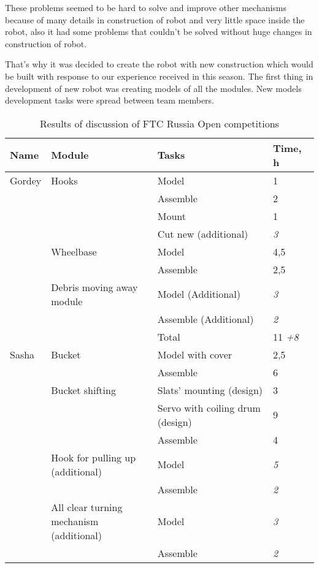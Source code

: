 These problems seemed to be hard to solve and improve other mechanisms because of many details in construction of robot and very little space inside the robot, also it had some problems that couldn't be solved without huge changes in construction of robot. 

That’s why it was decided to create the robot with new construction which would be built with response to our experience received in this season. The first thing in development of new robot was creating models of all the modules. New models development tasks were spread between team members.

\begin{table}[H]
	\caption{Results of discussion of FTC Russia Open competitions}
	\label{tabular:PlanRUS28.02}
	\begin{center}
		\begin{tabular}{|p{0.12\linewidth}|p{0.35\linewidth}|p{0.38\linewidth}|p{0.15\linewidth}|}
			\hline
			Name & Module & Tasks & Time, h \\
			\hline
			Gordey	& Hooks	& Model	& 1 \\
			& & Assemble & 2 \\
			& & Mount & 1 \\
			& & Cut new (additional) & \textit{3} \\
			\hline
			& Wheelbase & Model & 4,5 \\
			& & Assemble	& 2,5 \\
			& Debris moving away module	& Model (Additional)	& \textit{3} \\
			& & Assemble (Additional) & \textit{2} \\
			\hline
			& & Total & 11 \textit{+8} \\
			\hline 
			\hline
			Sasha & Bucket	& Model with cover	& 2,5 \\
			& & Assemble & 6 \\
			\hline
			& Bucket shifting & Slats' mounting (design) & 3 \\
			& & Servo with coiling drum (design)	& 9 \\   
			& & Assemble	& 4 \\                                
			\hline
			& Hook for pulling up (additional)	& Model	& \textit{5} \\              
			& & Assemble	& \textit{2}\\          
			& All clear turning mechanism (additional) & Model & \textit{3}\\       
			& & Assemble	& \textit{2} \\

\end{tabular}
\end{center}
\end{table}
